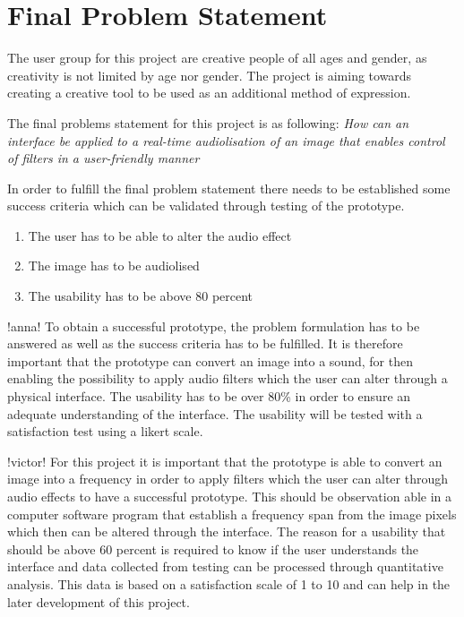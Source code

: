 \chapter{Final Problem Statement}\label{ch:finalproblem}

The user group for this project are creative people of all ages and gender, as creativity is not limited by age nor gender. 
The project is aiming towards creating a creative tool to be used as an additional method of expression. 

The final problems statement for this project is as following:
\textit{How can an interface be applied to a real-time audiolisation of an image that enables control of filters in a user-friendly manner}

In order to fulfill the final problem statement there needs to be established some success criteria which can be validated through testing of the prototype. 
\begin{enumerate}
\item The user has to be able to alter the audio effect
\item The image has to be audiolised 
\item The usability has to be above 80 percent
\end{enumerate}

!anna!
To obtain a successful prototype, the problem formulation has to be answered as well as the success criteria has to be fulfilled. It is therefore important that the prototype can convert an image into a sound, for then enabling the possibility to apply audio filters which the user can alter through a physical interface. The usability has to be over 80\% in order to ensure an adequate understanding of the interface. The usability will be tested with a satisfaction test using a likert scale.


!victor!
For this project it is important that the prototype is able to convert an image into a frequency in order to apply filters which the user can alter through audio effects to have a successful prototype. This should be observation able in a computer software program that establish a frequency span from the image pixels which then can be altered through the interface. The reason for a usability that should be above 60 percent is required to know if the user understands the interface and data collected from testing can be processed through quantitative analysis. This data is based on a satisfaction scale of 1 to 10 and can help in the later development of this project. 

